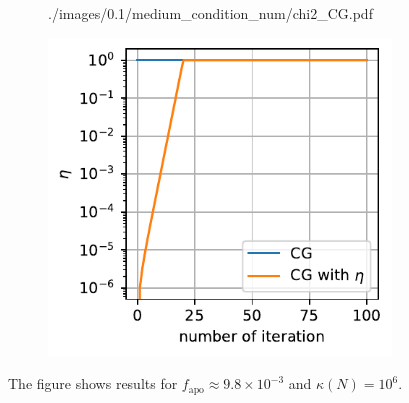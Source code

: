 \documentclass[11pt, letterpaper]{article}
\begin{document}
\begin{figure}[htb]
\begin{subfigure}{0.33\textwidth}
        {./images/0.1/medium_condition_num/chi2_CG.pdf}
    \caption{}
    \label{medium condi num chi2 CG}
\end{subfigure}%
\begin{subfigure}{0.33\textwidth}
    \centering
    \includegraphics[width=\linewidth]
        {./images/0.1/medium_condition_num/eta_CG.pdf}
    \caption{}
    \label{medium condi num eta CG}
\end{subfigure}
\caption{The figure shows results for $f_{\text{apo}}\approx 9.8\times10^{-3}$ 
    and $\kappa(N) = 10^6$.
}
\label{medium condi num CG}
\end{figure}
\end{document}
